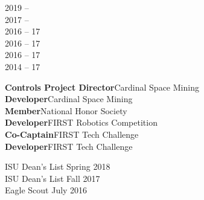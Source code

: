 \documentclass[9pt]{developercv} %
\begin{document}

\begin{minipage}[t]{0.17\textwidth}
	\vspace{-\baselineskip} %

	
	2019 -- \\
	2017 -- \\
	2016 -- 17 \\
	2016 -- 17 \\
	2016 -- 17 \\
	2014 -- 17 \\

\end{minipage}
\hfill
\begin{minipage}[t]{0.5\textwidth}
	\vspace{-\baselineskip} %
	
	\vspace{13mm}

	\textbf{Controls Project Director}\hfill Cardinal Space Mining \\
	\textbf{Developer}\hfill Cardinal Space Mining \\
	\textbf{Member}\hfill National Honor Society \\
	\textbf{Developer}\hfill FIRST Robotics Competition \\
	\textbf{Co-Captain}\hfill FIRST Tech Challenge \\
	\textbf{Developer}\hfill FIRST Tech Challenge \\
\end{minipage}
\hfill
\begin{minipage}[t]{0.3\textwidth}
	\vspace{-\baselineskip} %


	ISU Dean's List \hfill Spring 2018 \\
	ISU Dean's List \hfill Fall 2017 \\
	Eagle Scout \hfill July 2016 \\

\end{minipage}

\end{document}
